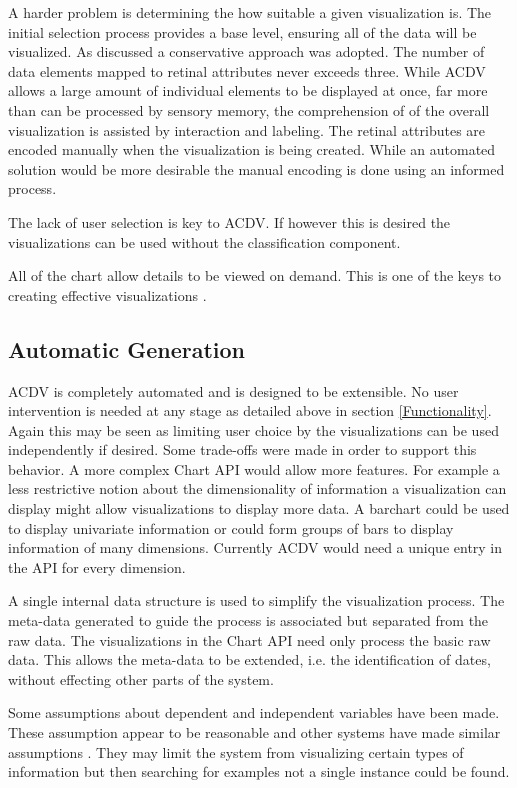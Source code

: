 \documentclass[a4paper, 11pt, titlepage, onehalfspacing]{report}
\begin{document}
A harder problem is determining the how suitable a given visualization is. The initial selection process provides a base level, ensuring all of the data will be visualized. As discussed a conservative approach was adopted. The number of data elements mapped to retinal attributes never exceeds three. While AC\lightning{}DV allows a large amount of individual elements to be displayed at once, far more than can be processed by sensory memory, the comprehension of of the overall visualization is assisted by interaction and labeling. The retinal attributes are encoded manually when the visualization is being created. While an automated solution would be more desirable the manual encoding is done using an informed process. 

The lack of user selection is key to AC\lightning{}DV. If however this is desired the visualizations can be used without the classification component.


All of the chart allow details to be viewed on demand. This is one of the keys to creating effective visualizations \cite{shneiderman1996eyes}. 

\subsection{Automatic Generation}
AC\lightning{}DV is completely automated and is designed to be extensible. No user intervention is needed at any stage as detailed above in section \ref{Functionality}. Again this may be seen as limiting user choice by the visualizations can be used independently if desired. Some trade-offs were made in order to support this behavior. A more complex Chart API would allow more features. For example a less restrictive notion about the dimensionality of information a visualization can display might allow visualizations to display more data. A barchart could be used to display univariate information or could form groups of bars to display information of many dimensions. Currently AC\lightning{}DV would need a unique entry in the API for every dimension.

A single internal data structure is used to simplify the visualization process. The meta-data generated to guide the process is associated but separated from the raw data. The visualizations in the Chart API need only process the basic raw data. This allows the meta-data to be extended, i.e. the identification of dates, without effecting other parts of the system. 

Some assumptions about dependent and independent variables have been made. These assumption appear to be reasonable and other systems have made similar assumptions \cite{stolte2002polaris}. They may limit the system from visualizing certain types of information but then searching for examples not a single instance could be found. 
\end{document}

